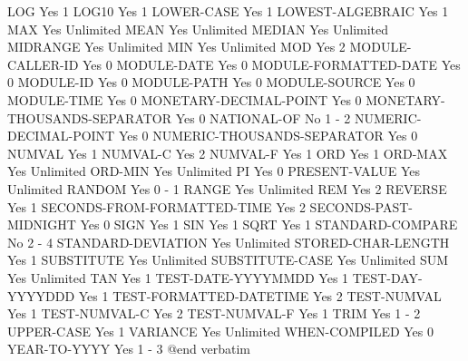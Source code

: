 LOG                             Yes             1
LOG10                           Yes             1
LOWER-CASE                      Yes             1
LOWEST-ALGEBRAIC                Yes             1
MAX                             Yes             Unlimited
MEAN                            Yes             Unlimited
MEDIAN                          Yes             Unlimited
MIDRANGE                        Yes             Unlimited
MIN                             Yes             Unlimited
MOD                             Yes             2
MODULE-CALLER-ID                Yes             0
MODULE-DATE                     Yes             0
MODULE-FORMATTED-DATE           Yes             0
MODULE-ID                       Yes             0
MODULE-PATH                     Yes             0
MODULE-SOURCE                   Yes             0
MODULE-TIME                     Yes             0
MONETARY-DECIMAL-POINT          Yes             0
MONETARY-THOUSANDS-SEPARATOR    Yes             0
NATIONAL-OF                     No              1 - 2
NUMERIC-DECIMAL-POINT           Yes             0
NUMERIC-THOUSANDS-SEPARATOR     Yes             0
NUMVAL                          Yes             1
NUMVAL-C                        Yes             2
NUMVAL-F                        Yes             1
ORD                             Yes             1
ORD-MAX                         Yes             Unlimited
ORD-MIN                         Yes             Unlimited
PI                              Yes             0
PRESENT-VALUE                   Yes             Unlimited
RANDOM                          Yes             0 - 1
RANGE                           Yes             Unlimited
REM                             Yes             2
REVERSE                         Yes             1
SECONDS-FROM-FORMATTED-TIME     Yes             2
SECONDS-PAST-MIDNIGHT           Yes             0
SIGN                            Yes             1
SIN                             Yes             1
SQRT                            Yes             1
STANDARD-COMPARE                No              2 - 4
STANDARD-DEVIATION              Yes             Unlimited
STORED-CHAR-LENGTH              Yes             1
SUBSTITUTE                      Yes             Unlimited
SUBSTITUTE-CASE                 Yes             Unlimited
SUM                             Yes             Unlimited
TAN                             Yes             1
TEST-DATE-YYYYMMDD              Yes             1
TEST-DAY-YYYYDDD                Yes             1
TEST-FORMATTED-DATETIME         Yes             2
TEST-NUMVAL                     Yes             1
TEST-NUMVAL-C                   Yes             2
TEST-NUMVAL-F                   Yes             1
TRIM                            Yes             1 - 2
UPPER-CASE                      Yes             1
VARIANCE                        Yes             Unlimited
WHEN-COMPILED                   Yes             0
YEAR-TO-YYYY                    Yes             1 - 3
@end verbatim
